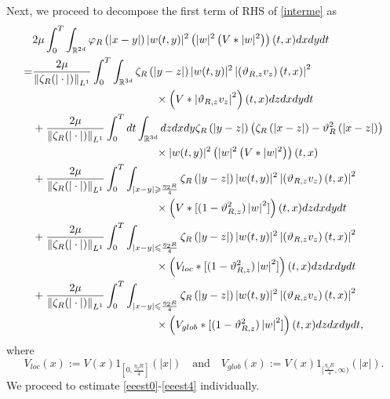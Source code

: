 \documentclass[reqno,11pt]{amsart}
\theoremstyle{plain}
\theoremstyle{definition}
\newcommand{\qtq}[1]{\quad\text{#1}\quad}
\numberwithin{equation}{section}
\numberwithin{theorem}{section}
\def\geq{\geqslant}
\def\leq{\leqslant}
\begin{document}
Next, we proceed to decompose the first term of RHS of \eqref{interme} as
\begin{align}
& 2\mu \int_{0}^{T} \int_{\mathbb{R}^{2d}} \varphi_{R}\left(|x-y|\right)|w(t, y)|^{2}\left(|w|^{2}\left(V *|w|^{2}\right)\right)(t, x) d x d y d t \notag\\
=&\frac{2\mu}{\left\|\zeta_{R}(|\cdot|)\right\|_{L^{1}}} \int_{0}^{T} \int_{\mathbb{R}^{3d}}  \zeta_{R}\left(\left| y-z\right|\right)|w(t, y)|^{2}\left|\left(\vartheta_{R,z} v_{z}\right)(t, x)\right|^{2}\notag\\
&\hspace{26ex}\times\left(V *\left|\vartheta_{R,z} v_{z}\right|^{2}\right)(t, x) d z d x d y d t\label{eeest1}\\
&+ \frac{2\mu}{\left\|\zeta_{R}(|\cdot|)\right\|_{L^{1}}} \int_{0}^{T} d t \int_{\mathbb{R}^{3d}} d z d x d y  \zeta_{R}\left(\left| y-z\right|\right)\left(\zeta_{R}\left(\left| x-z\right|\right)-\vartheta_{R}^{2}\left(\left|x-z\right|\right)\right)\notag \\
&\hspace{26ex}\times|w(t, y)|^{2}\left(|w|^{2}\left(V *|w|^{2}\right)\right)(t, x) \label{eeest0} \\
&+\frac{2\mu}{\left\|\zeta_{R}(|\cdot|)\right\|_{L^{1}}} \int_{0}^{T} \int_{|x-y|\geq\frac{\eta_2 R}{4}}  \zeta_{R}\left(\left| y-z\right|\right)|w(t, y)|^{2}\left|\left(\vartheta_{R,z} v_{z}\right)(t, x)\right|^{2}\notag\\
&\hspace{26ex}\times\left(V *[(1-\vartheta^2_{R,z} )\left|w\right|^{2}]\right)(t, x) d z d x d y d t\label{eeest2}\\
&+\frac{2\mu}{\left\|\zeta_{R}(|\cdot|)\right\|_{L^{1}}} \int_{0}^{T} \int_{|x-y|\leq\frac{\eta_2 R}{4}}  \zeta_{R}\left(\left| y-z\right|\right)|w(t, y)|^{2}\left|\left(\vartheta_{R,z} v_{z}\right)(t, x)\right|^{2}\notag\\
&\hspace{26ex}\times\left(V_{loc} *[(1-\vartheta^2_{R,z} )\left|w\right|^{2}]\right)(t, x) d z d x d y d t\label{eeest3}\\
&+\frac{2\mu}{\left\|\zeta_{R}(|\cdot|)\right\|_{L^{1}}} \int_{0}^{T} \int_{|x-y|\leq\frac{\eta_2 R}{4}}  \zeta_{R}\left(\left| y-z\right|\right)|w(t, y)|^{2}\left|\left(\vartheta_{R,z} v_{z}\right)(t, x)\right|^{2}\notag\\
&\hspace{26ex}\times\left(V_{glob} *[(1-\vartheta^2_{R,z} )\left|w\right|^{2}]\right)(t, x) d z d x d y d t,\label{eeest4}
\end{align}
where
\[
V_{loc}(x):=V(x) 1_{[0, \frac{\eta_2 R}{4}]}(|x|)\qtq{and}V_{glob}(x):=V(x) 1_{[\frac{\eta_2 R}{4},\infty)}(|x|).
\]
We proceed to estimate \eqref{eeest0}-\eqref{eeest4} individually.
\end{document}
